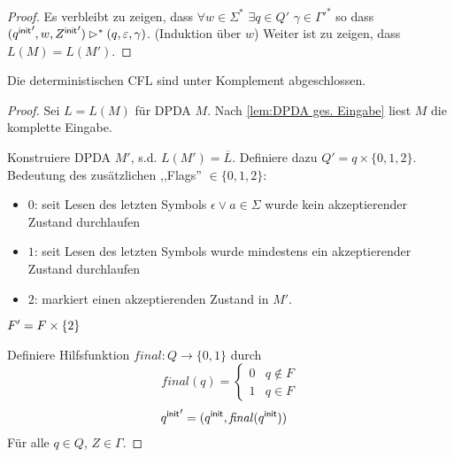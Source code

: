 {\begin{proof}
  Es verbleibt zu zeigen, dass $\forall w\in \Sigma^*$ $\exists q\in Q'$
  $\gamma\in\Gamma'^*$ so dass $({q^\mathsf{init}}', w, {Z^\mathsf{init}}') \rhd^* (q,
  \varepsilon, \gamma)$. (Induktion über $w$) Weiter ist zu zeigen,
  dass $L (M) = L (M')$.
\end{proof}

\begin{Satz}[name={[Abgeschlossenheit der deterministischen \acs*{CFL}]}]
        Die deterministischen \ac{CFL} sind unter Komplement abgeschlossen.
\end{Satz}
\begin{proof}
  Sei $L=L(M)$ für \ac{DPDA} $M$. Nach \autoref{lem:DPDA ges. Eingabe} liest $M$ die komplette Eingabe. 

  Konstruiere \ac{DPDA} $M'$, s.d. $ L(M') = \overline{L}$. 
  Definiere dazu $Q'= q \times \{0,1,2\}$. Bedeutung des zusätzlichen ,,Flags'' $\in \{0,1,2\}$:
  \begin{itemize}
  \item $0$: seit Lesen des letzten Symbols $\epsilon \vee a \in \Sigma$ wurde kein akzeptierender Zustand durchlaufen
  \item $1$: seit Lesen des letzten Symbols wurde mindestens ein
    akzeptierender Zustand durchlaufen 
  \item $2$: markiert einen akzeptierenden Zustand in $M'$.
  \end{itemize}
        
  $F'=F\times \{2\}$

  Definiere Hilfsfunktion $\mathit{final}:Q\to \{0,1\}$ durch 
  \begin{displaymath}
    \mathit{final} (q) =
    \begin{cases}
      0 & q\notin F \\ 1 & q \in F
    \end{cases}
  \end{displaymath}
  \begin{align*}
    {q^\mathsf{init}}' &= (q^\mathsf{init},\mathit{final} (q^\mathsf{init}))
  \end{align*}
  Für alle $q \in Q$, $Z\in\Gamma$.
  

\end{proof}}
